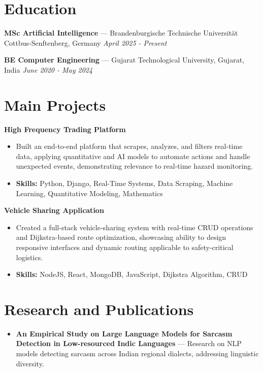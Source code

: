 \documentclass[a4paper,10pt]{article}
\begin{document}
\section*{Education}
\textbf{MSc Artificial Intelligence} — Brandenburgische Technische Universität Cottbus-Senftenberg, Germany \hfill \textit{April 2025 - Present}\par
\vspace{1.5pt}
\textbf{BE Computer Engineering} — Gujarat Technological University, Gujarat, India \hfill \textit{June 2020 - May 2024}\par

\section*{Main Projects}
\textbf{High Frequency Trading Platform}\par
\vspace{1pt}
\begin{itemize}
  \item Built an end-to-end platform that scrapes, analyzes, and filters real-time data, applying quantitative and AI models to automate actions and handle unexpected events, demonstrating relevance to real-time hazard monitoring.
  \item \textbf{Skills:} Python, Django, Real-Time Systems, Data Scraping, Machine Learning, Quantitative Modeling, Mathematics
\end{itemize}
\vspace{3pt}
\textbf{Vehicle Sharing Application}\par
\vspace{1pt}
\begin{itemize}
  \item Created a full-stack vehicle-sharing system with real-time CRUD operations and Dijkstra-based route optimization, showcasing ability to design responsive interfaces and dynamic routing applicable to safety-critical logistics.
  \item \textbf{Skills:} NodeJS, React, MongoDB, JavaScript, Dijkstra Algorithm, CRUD
\end{itemize}

\section*{Research and Publications}
\begin{itemize}
\item \textbf{An Empirical Study on Large Language Models for Sarcasm Detection in Low-resourced Indic Languages} — Research on NLP models detecting sarcasm across Indian regional dialects, addressing linguistic diversity.
\end{itemize}
\end{document}
